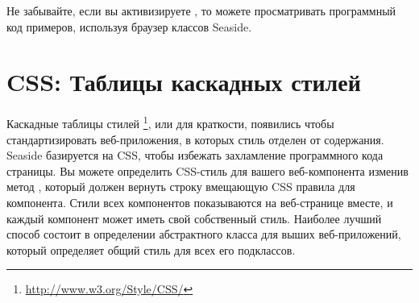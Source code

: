 \documentclass[a4paper,10pt,twoside]{book}
\begin{document}

Не забывайте, если вы активизируете ,
то можете просматривать программный код примеров,
используя браузер классов Seaside.


\section{CSS: Таблицы каскадных стилей}








Каскадные таблицы стилей \footnote{\url{http://www.w3.org/Style/CSS/}},
или  для краткости,
появились чтобы стандартизировать веб-приложения,
в которых стиль отделен от содержания.
Seaside базируется на CSS,
чтобы избежать захламление программного кода страницы.
Вы можете определить CSS-стиль для вашего веб-компонента изменив метод
, который должен вернуть строку вмещающую CSS правила
для компонента.
Стили всех компонентов показываются на веб-странице вместе,
и каждый компонент может иметь свой собственный стиль.
Наиболее лучший способ состоит в определении абстрактного класса
для выших веб-приложений,
который определяет общий стиль для всех его подклассов.
\end{document}
